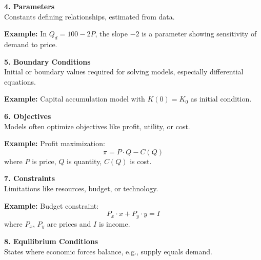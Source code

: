 \begin{tcolorbox}[sectionbox]
\textbf{4. Parameters}\\
Constants defining relationships, estimated from data.
\end{tcolorbox}

\begin{tcolorbox}[examplebox]
\textbf{Example:} In $Q_d = 100 - 2P$, the slope $-2$ is a parameter showing sensitivity of demand to price.
\end{tcolorbox}

\begin{tcolorbox}[sectionbox]
\textbf{5. Boundary Conditions}\\
Initial or boundary values required for solving models, especially differential equations.
\end{tcolorbox}

\begin{tcolorbox}[examplebox]
\textbf{Example:} Capital accumulation model with $K(0) = K_0$ as initial condition.
\end{tcolorbox}

\begin{tcolorbox}[sectionbox]
\textbf{6. Objectives}\\
Models often optimize objectives like profit, utility, or cost.
\end{tcolorbox}

\begin{tcolorbox}[examplebox]
\textbf{Example:} Profit maximization:
\[
\pi = P \cdot Q - C(Q)
\]
where $P$ is price, $Q$ is quantity, $C(Q)$ is cost.
\end{tcolorbox}

\begin{tcolorbox}[sectionbox]
\textbf{7. Constraints}\\
Limitations like resources, budget, or technology.
\end{tcolorbox}

\begin{tcolorbox}[examplebox]
\textbf{Example:} Budget constraint:
\[
P_x \cdot x + P_y \cdot y = I
\]
where $P_x$, $P_y$ are prices and $I$ is income.
\end{tcolorbox}

\begin{tcolorbox}[sectionbox]
\textbf{8. Equilibrium Conditions}\\
States where economic forces balance, e.g., supply equals demand.
\end{tcolorbox}

